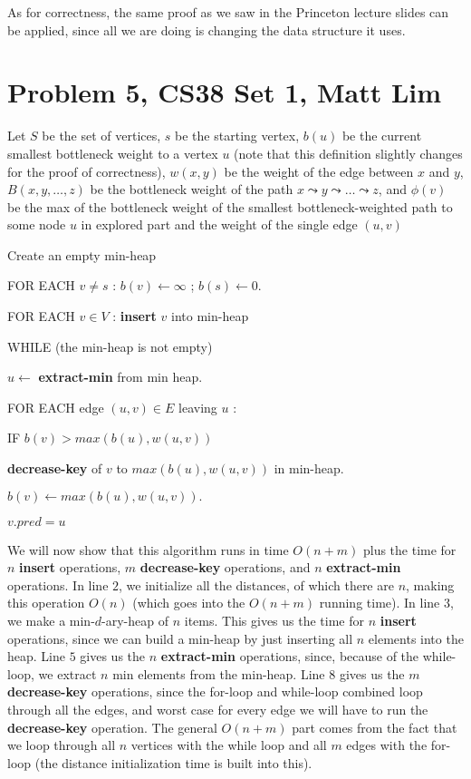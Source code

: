 \documentclass{article}
\begin{document}
As for correctness, the same proof as we saw in the Princeton lecture slides can
be applied, since all we are doing is changing the data structure it uses.
\newpage

\section*{Problem 5, CS38 Set 1, Matt Lim}
Let $S$ be the set of vertices, $s$ be the starting vertex, $b(u)$ be the
current smallest bottleneck weight to a vertex $u$ (note that this definition
slightly changes for the proof of correctness),
$w(x,y)$ be the weight of the edge between $x$ and $y$, $B(x,y, \dots, z)$
be the bottleneck weight of the path $x \leadsto y \leadsto \dots \leadsto z$, and
$\phi(v)$ be the max of the bottleneck weight of the smallest bottleneck-weighted
path to some node $u$ in explored part and the weight of the single edge $(u,v)$
\begin{enumerate}
    \item Create an empty min-heap
    \item FOR EACH $v \neq s$ : $b(v) \leftarrow \infty$ ; $b(s) \leftarrow 0$.
    \item FOR EACH $v \in V$ : \textbf{insert} $v$ into min-heap
    \item WHILE (the min-heap is not empty)
    {\setlength\itemindent{25pt} \item $u \leftarrow$ \textbf{extract-min} from min
    heap.}
    {\setlength\itemindent{25pt} \item FOR EACH edge $(u,v) \in E$ leaving $u$ :}
    {\setlength\itemindent{50pt} \item IF $b(v) > max(b(u),w(u,v))$}
    {\setlength\itemindent{75pt} \item \textbf{decrease-key} of $v$ to
        $max(b(u),w(u,v))$ in min-heap.}
    {\setlength\itemindent{75pt} \item $b(v) \leftarrow max(b(u),w(u,v)).$}
    {\setlength\itemindent{75pt} \item $v.pred = u$}
\end{enumerate}
We will now show that this algorithm runs in time $O(n+m)$ plus the time for
$n$ \textbf{insert} operations, $m$ \textbf{decrease-key} operations, and
$n$ \textbf{extract-min} operations.
In line $2$, we initialize all the distances, of which there
are $n$, making this operation $O(n)$ (which goes into the $O(n+m)$ running
time).  In line $3$, we make a min-$d$-ary-heap
of $n$ items. This gives us the time for $n$ \textbf{insert}
operations, since we can build a min-heap by just inserting all $n$ elements
into the heap. Line $5$ gives us the $n$ \textbf{extract-min} operations, since,
because of the while-loop, we extract $n$ min elements from the min-heap. Line
$8$ gives us the $m$ \textbf{decrease-key} operations, since the for-loop and
while-loop combined loop through all the edges, and worst case for every edge
we will have to run the \textbf{decrease-key} operation. The general $O(n+m)$
part comes from the fact that we loop through all $n$ vertices with the while
loop and all $m$ edges with the for-loop (the distance initialization time is
built into this).
\end{document}
